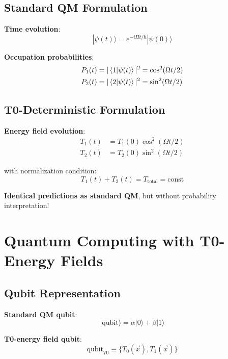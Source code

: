 \documentclass[12pt,a4paper]{article}
\newcommand{\psiket}[1]{|#1\rangle}
\begin{document}
	\subsection{Standard QM Formulation}
	
	\textbf{Time evolution}:
	\begin{equation}
		\psiket{\psi(t)} = e^{-iHt/\hbar}\psiket{\psi(0)}
	\end{equation}
	
	\textbf{Occupation probabilities}:
	\begin{align}
		P_1(t) &= |\braket{1}{\psi(t)}|^2 = \cos^2(\Omega t/2) \\
		P_2(t) &= |\braket{2}{\psi(t)}|^2 = \sin^2(\Omega t/2)
	\end{align}
	
	\subsection{T0-Deterministic Formulation}
	
	\textbf{Energy field evolution}:
	\begin{align}
		T_1(t) &= T_1(0) \cos^2(\Omega t/2) \\
		T_2(t) &= T_2(0) \sin^2(\Omega t/2)
	\end{align}
	
	with normalization condition:
	\begin{equation}
		T_1(t) + T_2(t) = T_{\text{total}} = \text{const}
	\end{equation}
	
	\textbf{Identical predictions as standard QM}, but without probability interpretation!
	
	\section{Quantum Computing with T0-Energy Fields}
	
	\subsection{Qubit Representation}
	
	\textbf{Standard QM qubit}:
	\begin{equation}
		\psiket{\text{qubit}} = \alpha\psiket{0} + \beta\psiket{1}
	\end{equation}
	
	\textbf{T0-energy field qubit}:
	\begin{equation}
		\boxed{\text{qubit}_{T0} \equiv \{T_0(\vec{x}), T_1(\vec{x})\}}
	\end{equation}
	
\end{document}
